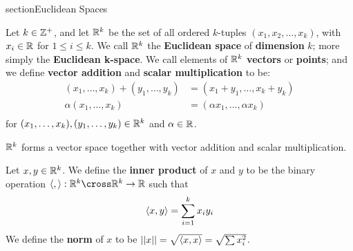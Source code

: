 section{Euclidean Spaces}

\begin{definition}
    Let $k \in \mathbb{Z}^+$, and let $\mathbb{R}^k$ be the set of all ordered  $k$-tuples
    $(x_1,x_2, \dots, x_k)$, with $x_i \in \mathbb{R}$ for  $1 \leq i \leq k$. We call $\mathbb{R}^k$
    the \textbf{Euclidean space} of \textbf{dimension} $k$; more simply  the \textbf{Euclidean k-space}.
    We call elements of  $\mathbb{R}^k$  \textbf{vectors} or \textbf{points}; and we define
    \textbf{vector addition} and \textbf{scalar multiplication} to be:
        \begin{align*}
            (x_1, \dots, x_k)+(y_1, \dots, y_k) &= (x_1+y_1, \dots, x_k+y_k) \\
            \alpha(x_1, \dots, x_k) &= (\alpha x_1, \dots, \alpha x_k) \\
        \end{align*}
        for $(x_1, \dots, x_k),(y_1, \dots, y_k) \in \mathbb{R}^k$ and $\alpha \in \mathbb{R}$.
\end{definition}

\begin{theorem}\label{1.5.1}
    $\mathbb{R}^k$ forms a vector space together with vector addition and scalar multiplication.
\end{theorem}

\begin{definition}
    Let $x,y \in \mathbb{R}^k$. We define the \textbf{inner product} of  $x$ and  $y$ to be the
    binary operation $\vbrack{,}: \R^k \cross \R^k \rightarrow \R$ such that
        \begin{equation*}
            \langle x,y\rangle=\sum_{i=1}^{k}{x_iy_i}
        \end{equation*}
        We define the  \textbf{norm} of  $x$ to be  $||x||=\sqrt{\langle x,x\rangle}=\sqrt{\sum{x_i^2}}$.
\end{definition}

